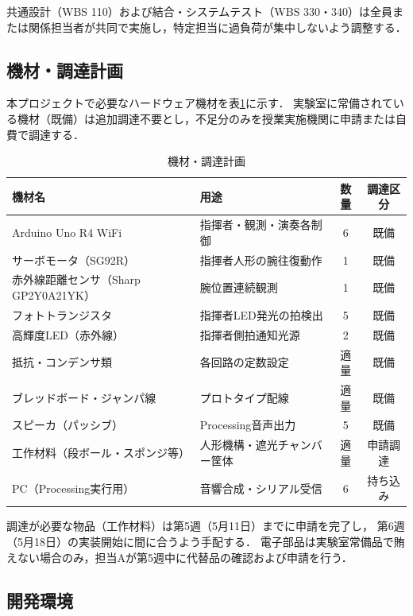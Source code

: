 \documentclass[lualatex,book,paper=a4paper,jafontsize=11.5pt,jafontscale=1.05,oneside]{jlreq}
\begin{document}
共通設計（WBS 110）および結合・システムテスト（WBS 330・340）は全員または関係担当者が共同で実施し，特定担当に過負荷が集中しないよう調整する．

\subsection{機材・調達計画}

本プロジェクトで必要なハードウェア機材を表\ref{tab:procurement}に示す．
実験室に常備されている機材（既備）は追加調達不要とし，不足分のみを授業実施機関に申請または自費で調達する．

\begin{table}[H]
  \centering
  \caption{機材・調達計画}
  \label{tab:procurement}
  \begin{tabularx}{\linewidth}{Xlcc}
    \toprule
    機材名 & 用途 & 数量 & 調達区分 \\
    \midrule
    Arduino Uno R4 WiFi & 指揮者・観測・演奏各制御 & 6 & 既備 \\
    サーボモータ（SG92R） & 指揮者人形の腕往復動作 & 1 & 既備 \\
    赤外線距離センサ（Sharp GP2Y0A21YK） & 腕位置連続観測 & 1 & 既備 \\
    フォトトランジスタ & 指揮者LED発光の拍検出 & 5 & 既備 \\
    高輝度LED（赤外線） & 指揮者側拍通知光源 & 2 & 既備 \\
    抵抗・コンデンサ類 & 各回路の定数設定 & 適量 & 既備 \\
    ブレッドボード・ジャンパ線 & プロトタイプ配線 & 適量 & 既備 \\
    スピーカ（パッシブ）& Processing音声出力 & 5 & 既備 \\
    工作材料（段ボール・スポンジ等） & 人形機構・遮光チャンバー筐体 & 適量 & 申請調達 \\
    PC（Processing実行用） & 音響合成・シリアル受信 & 6 & 持ち込み \\
    \bottomrule
  \end{tabularx}
\end{table}

調達が必要な物品（工作材料）は第5週（5月11日）までに申請を完了し，
第6週（5月18日）の実装開始に間に合うよう手配する．
電子部品は実験室常備品で賄えない場合のみ，担当Aが第5週中に代替品の確認および申請を行う．

\subsection{開発環境}
\end{document}
